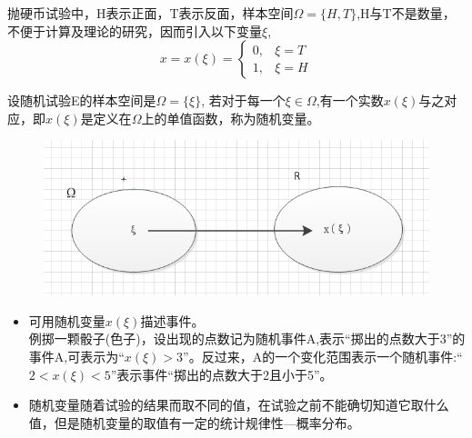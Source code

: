 \begin{frame}
\begin{example}
	抛硬币试验中，H表示正面，T表示反面，样本空间$\Omega=\{H,T\}$,H与T不是数量，不便于计算及理论的研究，因而引入以下变量$\xi$,
	$$x=x(\xi)=
	\begin{cases}
	0, &\xi=T\\
	1, &\xi=H
	\end{cases}
	$$
\end{example}  
\end{frame}

\begin{frame}
\begin{definition}
设随机试验E的样本空间是$\Omega=\{\xi\}$, 若对于每一个$\xi\in\Omega$,有一个实数$x(\xi)$与之对应，即$x(\xi)$是定义在$\Omega$上的单值函数，称为随机变量。
\end{definition}
\begin{figure}[htbp]
\includegraphics[scale=0.3]{xi_map}
\end{figure}
\begin{itemize}
\item 可用随机变量$x(\xi)$描述事件。\\
例掷一颗骰子(色子)，设出现的点数记为随机事件A,表示``掷出的点数大于3''的事件A,可表示为``$x(\xi)>3$''。反过来，A的一个变化范围表示一个随机事件:``$2<x(\xi)<5$''表示事件``掷出的点数大于2且小于5''。
\item 随机变量随着试验的结果而取不同的值，在试验之前不能确切知道它取什么值，但是随机变量的取值有一定的统计规律性---概率分布。
\end{itemize}
\end{frame}


